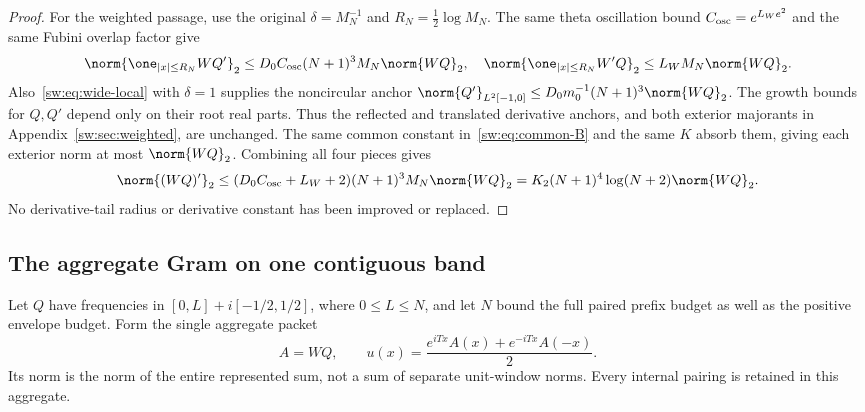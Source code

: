 \documentclass[11pt,a4paper]{article}
\numberwithin{equation}{section}
\theoremstyle{definition}\newtheorem{definition}[theorem]{Definition}
\theoremstyle{remark}\newtheorem{remark}[theorem]{Remark}
\begin{document}
\begin{proof}
For the weighted passage, use the original $\delta=M_N^{-1}$ and $R_N=\frac12\log M_N$. The same theta oscillation bound $C_{\rm osc}=e^{L_We^2}$ and the same Fubini overlap factor give
\[
 \norm{\one_{|x|\le R_N}WQ'}_2
 \le D_0C_{\rm osc}(N+1)^3M_N\norm{WQ}_2,
 \quad
 \norm{\one_{|x|\le R_N}W'Q}_2\le L_WM_N\norm{WQ}_2.
\]
Also~\eqref{sw:eq:wide-local} with $\delta=1$ supplies the noncircular anchor
$\norm{Q'}_{L^2[-1,0]}\le D_0m_0^{-1}(N+1)^3\norm{WQ}_2$.
The growth bounds for $Q,Q'$ depend only on their root real parts. Thus the reflected and translated derivative anchors, and both exterior majorants in Appendix~\ref{sw:sec:weighted}, are unchanged. The same common constant in~\eqref{sw:eq:common-B} and the same $K$ absorb them, giving each exterior norm at most $\norm{WQ}_2$. Combining all four pieces gives
\[
 \norm{(WQ)'}_2\le(D_0C_{\rm osc}+L_W+2)(N+1)^3M_N\norm{WQ}_2
 =K_2(N+1)^4\log(N+2)\norm{WQ}_2.
\]
No derivative-tail radius or derivative constant has been improved or replaced.
\end{proof}

\subsection{The aggregate Gram on one contiguous band}\label{sw:sec:aggregate}
Let $Q$ have frequencies in $[0,L]+i[-1/2,1/2]$, where $0\le L\le N$, and let $N$ bound the full paired prefix budget as well as the positive envelope budget. Form the single aggregate packet
\begin{equation}\label{sw:eq:aggregate-packet}
 A=WQ,\qquad
 u(x)=\frac{e^{iTx}A(x)+e^{-iTx}A(-x)}2.
\end{equation}
Its norm is the norm of the entire represented sum, not a sum of separate unit-window norms. Every internal pairing is retained in this aggregate.
\end{document}

